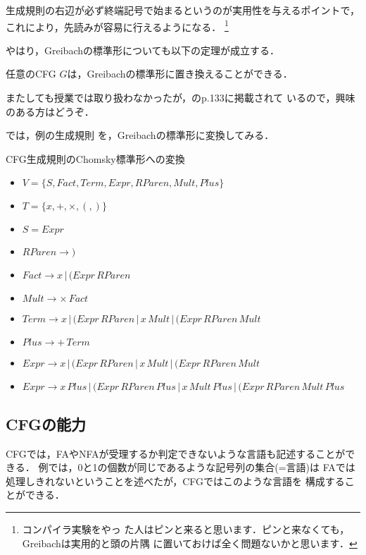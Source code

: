 生成規則の右辺が必ず終端記号で始まるというのが実用性を与えるポイントで，
これにより，先読みが容易に行えるようになる．
\footnote{コンパイラ実験をやっ
た人はピンと来ると思います．ピンと来なくても，Greibachは実用的と頭の片隅
に置いておけば全く問題ないかと思います．}

やはり，Greibachの標準形についても以下の定理が成立する．
\begin{mytheorem} \label{03greibach_standard_theorem}
 任意のCFG $G$は，Greibachの標準形に置き換えることができる．
\end{mytheorem}
またしても授業では取り扱わなかったが，\cite{波雄1972}のp.133に掲載されて
いるので，興味のある方はどうぞ．

では，例の生成規則
を，Greibachの標準形に変換してみる．
\begin{myexample}{CFG生成規則のChomsky標準形への変換}
 \begin{itemize}
  \item $V = \{S, Fact, Term, Expr, RParen, Mult, Plus\}$
  \item $T = \{x, +, \times, (, )\}$
  \item $S = Expr$
  \item $RParen \rightarrow )$
  \item $Fact \rightarrow x\, |\, (Expr\, RParen$
  \item $Mult \rightarrow \times\, Fact$
  \item $Term \rightarrow x\, |\, (Expr\, RParen\, |\, x\, Mult\, |\, (Expr\, RParen\, Mult$
  \item $Plus \rightarrow +\, Term$
  \item $Expr \rightarrow x\, |\, (Expr\, RParen\, |\, x\, Mult\, |\, (Expr\, RParen\, Mult$
  \item $Expr \rightarrow x\, Plus\, |\, (Expr\, RParen\, Plus\, |\, x\, Mult\, Plus\, |
       \, (Expr\, RParen\, Mult\, Plus$
 \end{itemize}
\end{myexample}

\subsection{CFGの能力}
CFGでは，FAやNFAが受理するか判定できないような言語も記述することができる．
例では，0と1の個数が同じであるような記号列の集合(=言語)は
FAでは処理しきれないということを述べたが，CFGではこのような言語を
構成することができる．

